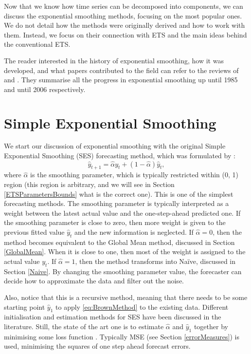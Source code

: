 \documentclass[
]{book}
\theoremstyle{definition}
\theoremstyle{definition}
\theoremstyle{definition}
\theoremstyle{definition}
\theoremstyle{remark}
\begin{document}
Now that we know how time series can be decomposed into components, we can discuss the exponential smoothing methods, focusing on the most popular ones. We do not detail how the methods were originally derived and how to work with them. Instead, we focus on their connection with ETS and the main ideas behind the conventional ETS.

The reader interested in the history of exponential smoothing, how it was developed, and what papers contributed to the field can refer to the reviews of \citet{Gardner1985} and \citet{Gardner2006}. They summarise all the progress in exponential smoothing up until 1985 and until 2006 respectively.

\hypertarget{SES}{%
\section{Simple Exponential Smoothing}\label{SES}}

We start our discussion of exponential smoothing with the original Simple Exponential Smoothing (SES) forecasting method, which was formulated by \citep{Brown1956}:
\begin{equation}
  \hat{y}_{t+1} = \hat{\alpha} {y}_{t} + (1 -\hat{\alpha}) \hat{y}_{t},
  \label{eq:BrownMethod}
\end{equation}
where \(\hat{\alpha}\) is the smoothing parameter, which is typically restricted within (0, 1) region (this region is arbitrary, and we will see in Section \ref{ETSParametersBounds} what is the correct one). This is one of the simplest forecasting methods. The smoothing parameter is typically interpreted as a weight between the latest actual value and the one-step-ahead predicted one. If the smoothing parameter is close to zero, then more weight is given to the previous fitted value \(\hat{y}_{t}\) and the new information is neglected. If \(\hat{\alpha}=0\), then the method becomes equivalent to the Global Mean method, discussed in Section \ref{GlobalMean}. When it is close to one, then most of the weight is assigned to the actual value \({y}_{t}\). If \(\hat{\alpha}=1\), then the method transforms into Naïve, discussed in Section \ref{Naive}. By changing the smoothing parameter value, the forecaster can decide how to approximate the data and filter out the noise.

Also, notice that this is a recursive method, meaning that there needs to be some starting point \(\hat{y}_1\) to apply \eqref{eq:BrownMethod} to the existing data. Different initialisation and estimation methods for SES have been discussed in the literature. Still, the state of the art one is to estimate \(\hat{\alpha}\) and \(\hat{y}_{1}\) together by minimising some loss function \citep{Hyndman2002}. Typically MSE (see Section \ref{errorMeasures}) is used, minimising the squares of one step ahead forecast errors.
\end{document}
